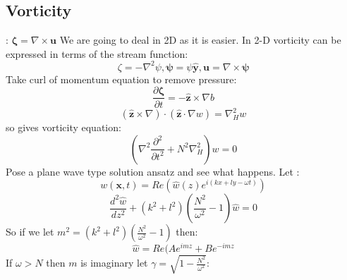 \documentclass{article}
\begin{document}
\subsection{Vorticity}: $\bm \zeta = \nabla \times \bm u$
We are going to deal in 2D as it is easier. In 2-D vorticity can be expressed in terms of the stream function:
$$
\zeta = - \nabla^2 \psi, \bm \psi = \psi \hat{\bm y}, \bm u = \nabla \times \bm \psi
$$
Take curl of momentum equation to remove pressure:
$$
\frac{\partial \bm \zeta}{\partial t} = - \hat{\bm z} \times \nabla b
$$
$$
(\hat{\bm z} \times \nabla) \cdot (\hat{\bm z} \cdot \nabla w) = \nabla^2_H w
$$
so gives vorticity equation:
\begin{equation}
        (\nabla^2 \frac{\partial^2}{\partial t^2} + N^2 \nabla^2_H) w = 0
\end{equation}
Pose a plane wave type solution ansatz and see what happens. Let :
$$
w(\bm x, t) = Re( \hat w(z) e^{i(kx + ly - \omega t)})
$$
$$
\frac{d^2 \hat w}{dz^2} + (k^2 + l^2) (\frac{N^2}{\omega^2} -1) \hat w = 0
$$
So if we let $m^2 = (k^2 + l^2) ( \frac{N^2}{\omega^2}-1)$ then:
$$
\hat w = Re( A e^{imz} + Be^{-imz}
$$
If $\omega > N$ then $m$ is imaginary let $\gamma = \sqrt{1- \frac{N^2}{\omega^2}}$:
\end{document}
